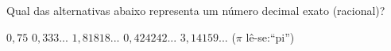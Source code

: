 Qual das alternativas abaixo representa um número decimal exato (racional)?

$0{,}75$
$0{,}333...$
$1{,}81818...$
$0{,}424242...$
$3{,}14159...$ ($\pi$ lê-se:``pi'')



